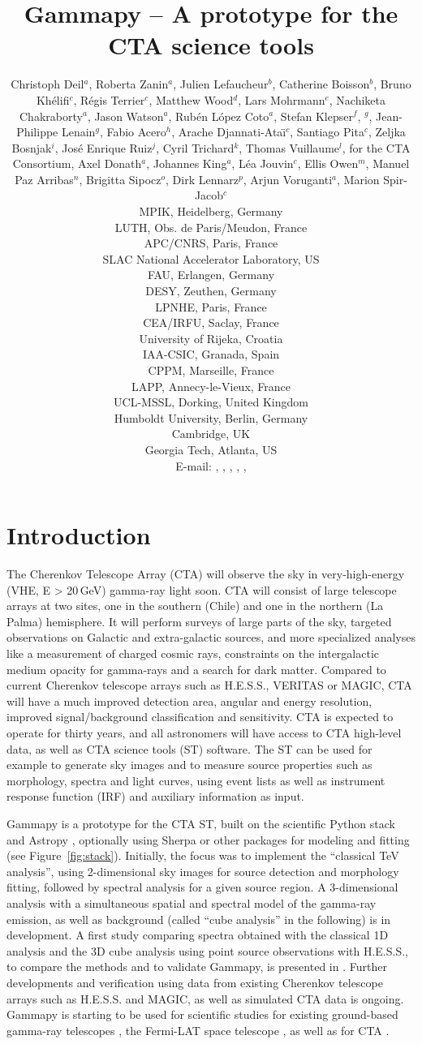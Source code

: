 \documentclass{PoS}
\title{Gammapy -- A prototype for the CTA science tools}
\author{
Christoph Deil$^a$,
Roberta Zanin$^a$,
Julien Lefaucheur$^b$,
Catherine Boisson$^b$,
Bruno Kh\'elifi$^c$,
R\'egis Terrier$^c$,
Matthew Wood$^d$,
Lars Mohrmann$^e$,
Nachiketa Chakraborty$^a$,
Jason Watson$^a$,
Rub\'en L\'opez Coto$^a$,
Stefan Klepser$^f$,
\speaker{Matteo Cerruti}$^g$,
Jean-Philippe Lenain$^g$,
Fabio Acero$^h$,
Arache Djannati-Ata{\"\i}$^c$,
Santiago Pita$^c$,
Zeljka Bosnjak$^i$,
Jos\'e Enrique Ruiz$^j$,
Cyril Trichard$^k$,
Thomas Vuillaume$^l$,
for the CTA Consortium,
Axel Donath$^a$,
Johannes King$^a$,
L\'ea Jouvin$^c$,
Ellis Owen$^m$,
Manuel Paz Arribas$^n$,
Brigitta Sipocz$^o$,
Dirk Lennarz$^p$,
Arjun Voruganti$^a$,
Marion Spir-Jacob$^c$
\\
\llap{$^a$}MPIK, Heidelberg, Germany\\
\llap{$^b$}LUTH, Obs. de Paris/Meudon, France\\
\llap{$^c$}APC/CNRS, Paris, France\\
\llap{$^d$}SLAC National Accelerator Laboratory, US\\
\llap{$^e$}FAU, Erlangen, Germany\\
\llap{$^f$}DESY, Zeuthen, Germany\\
\llap{$^g$}LPNHE, Paris, France\\
\llap{$^h$}CEA/IRFU, Saclay, France\\
\llap{$^i$}University of Rijeka, Croatia\\
\llap{$^j$}IAA-CSIC, Granada, Spain\\
\llap{$^k$}CPPM, Marseille, France\\
\llap{$^l$}LAPP, Annecy-le-Vieux, France\\
\llap{$^m$}UCL-MSSL, Dorking, United Kingdom\\
\llap{$^n$}Humboldt University, Berlin, Germany\\
\llap{$^o$}Cambridge, UK\\
\llap{$^p$}Georgia Tech, Atlanta, US\\
E-mail:
\email{Christoph.Deil@mpi-hd.mpg.de},
\email{Roberta.Zanin@mpi-hd.mpg.de},
\email{julien.lefaucheur@obspm.fr},
\email{catherine.boisson@obspm.fr},
\email{khelifi@apc.in2p3.fr},
}
\begin{document}
\section{Introduction}
\label{sec:intro}

The Cherenkov Telescope Array (CTA) will observe the sky in very-high-energy
(VHE, E > 20$\,$GeV) gamma-ray light soon. CTA will consist of large telescope
arrays at two sites, one in the southern (Chile) and one in the northern (La
Palma) hemisphere. It will perform surveys of large parts of the sky, targeted
observations on Galactic and extra-galactic sources, and more specialized
analyses like a measurement of charged cosmic rays, constraints on the
intergalactic medium opacity for gamma-rays and a search for dark matter.
Compared to current Cherenkov telescope arrays such as H.E.S.S., VERITAS or
MAGIC, CTA will have a much improved detection area, angular and energy
resolution, improved signal/background classification and sensitivity. CTA is
expected to operate for thirty years, and all astronomers will have access to
CTA high-level data, as well as CTA science tools (ST) software. The ST can be
used for example to generate sky images and to measure source properties such as
morphology, spectra and light curves, using event lists as well as instrument
response function (IRF) and auxiliary information as input.

Gammapy is a prototype for the CTA ST, built on the scientific Python stack and
Astropy \cite{astropy}, optionally using Sherpa \cite{sherpa2001, sherpa2009,
sherpa2011} or other packages for modeling and fitting (see
Figure~\ref{fig:stack}). Initially, the focus was to implement the ``classical
TeV analysis'', using 2-dimensional sky images for source detection and
morphology fitting, followed by spectral analysis for a given source region. A
3\hbox{-}dimensional analysis with a simultaneous spatial and spectral model of
the gamma-ray emission, as well as background (called ``cube analysis'' in the
following) is in development.
A first study comparing spectra obtained with the classical 1D analysis and the
3D cube analysis using point source observations with H.E.S.S., to compare the
methods and to validate Gammapy, is presented in \cite{lea}. Further
developments and verification using data from existing Cherenkov telescope
arrays such as H.E.S.S. and MAGIC, as well as simulated CTA data is ongoing.
Gammapy is starting to be used for scientific studies for existing ground-based
gamma-ray telescopes \cite{hgps, shells}, the Fermi-LAT space telescope
\cite{owen2015}, as well as for CTA \cite{julien, roberta, cyril}.
\end{document}
